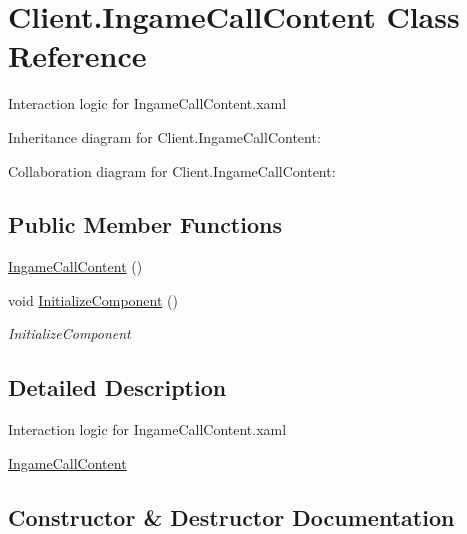 \hypertarget{class_client_1_1_ingame_call_content}{}\section{Client.\+Ingame\+Call\+Content Class Reference}
\label{class_client_1_1_ingame_call_content}


Interaction logic for Ingame\+Call\+Content.\+xaml  




Inheritance diagram for Client.\+Ingame\+Call\+Content\+:


Collaboration diagram for Client.\+Ingame\+Call\+Content\+:
\subsection*{Public Member Functions}
\begin{DoxyCompactItemize}
\item 
\hyperlink{class_client_1_1_ingame_call_content_a6bb1d77e0618a9f3771a1bc88f9f879f}{Ingame\+Call\+Content} ()
\item 
void \hyperlink{class_client_1_1_ingame_call_content_a4eb1a66c48e66c19ce568a7a2a25ce9e}{Initialize\+Component} ()
\begin{DoxyCompactList}\small\item\em Initialize\+Component \end{DoxyCompactList}\end{DoxyCompactItemize}


\subsection{Detailed Description}
Interaction logic for Ingame\+Call\+Content.\+xaml 

\hyperlink{class_client_1_1_ingame_call_content}{Ingame\+Call\+Content} 

\subsection{Constructor \& Destructor Documentation}
\mbox{\label{class_client_1_1_ingame_call_content_a6bb1d77e0618a9f3771a1bc88f9f879f}} 

